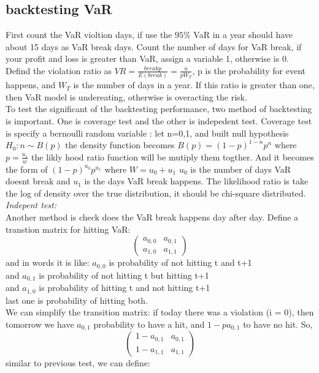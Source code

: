 \documentclass[a4paper,11pt]{article}
\begin{document}
\subsection{backtesting VaR}
First count the VaR violtion days, if use the $95\% $ VaR in a year should have about 15 days as VaR break days. Count the number of days for VaR break, if your profit and loss is greater than VaR, assign a variable 1, otherwise is 0. Defind the violation ratio as $VR=\frac{breakp}{E(break)}=\frac{u}{p W_T}$, p is the probability for event happens, and $W_T$ is the number of days in a year. If this ratio is greater than one, then VaR model is undereating, otherwise is overacting the risk.\\
To test the significant of the backtesting performance, two method of backtesting is important. One is coverage test and the other is indepedent test. Coverage test is specify a bernoulli random variable :
let n=0,1, and built null hypothesis $H_0: n \sim B(p)$ the density function becomes $ B(p)=(1-p)^{1-n}p^{n}$ where $p=\frac{u_1}{w}$ the likly hood ratio function will be mutiply them togther. And it becomes the form of $(1-p)^{u_0} p^{u_1}$ where $W=u_0+u_1$ $u_0$ is the number of days VaR doesnt break and $u_1$ is the days VaR break happens. The likelihood ratio is take the log of density over the true distribution, it should be chi-square distributed.\\
{\em Indepent test:}\\
Another method is check does the VaR break happens day after day. Define a transtion matrix for hitting VaR:
$$
\begin{pmatrix}
a_{0,0} & a_{0,1} \\
a_{1,0} & a_{1,1}
\end{pmatrix}
$$
and in words it is like: $a_{0,0}$ is probability of not hitting t and t+1\\
and $a_{0,1}$ is probability of not hitting t but hitting t+1\\
and $a_{1,0}$ is probability of hitting t and not hitting t+1\\
last one is probability of hitting both.\\
We can simplify the transition matrix: if today there was a violation (i = 0), then tomorrow
we have $a_{0,1}$ probability to have a hit, and  $1-pa_{0,1}$  to have no hit. So,
$$
\begin{pmatrix}
1-a_{0,1} & a_{0,1} \\
1-a_{1,1} & a_{1,1}
\end{pmatrix}
$$
similar to previous test, we can define:\\
\end{document}
